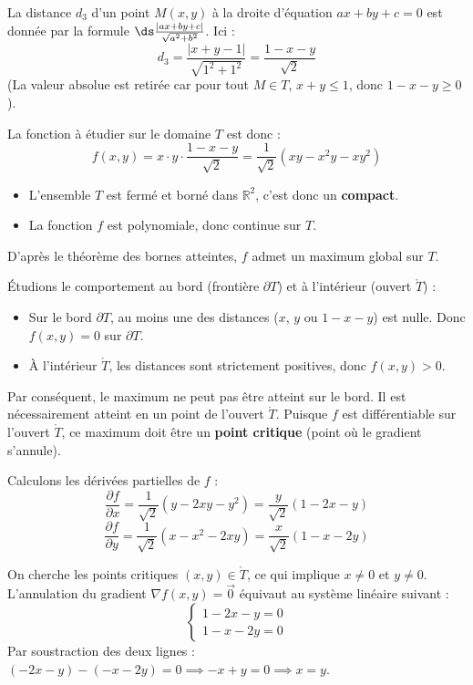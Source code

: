 \begin{exemple}
    La distance $d_3$ d'un point $M(x,y)$ à la droite d'équation $ax+by+c=0$ est donnée par la formule $\ds \frac{|ax+by+c|}{\sqrt{a^2+b^2}}$. Ici :
    \[
    d_3 = \frac{|x+y-1|}{\sqrt{1^2+1^2}} = \frac{1-x-y}{\sqrt{2}}
    \]
    (La valeur absolue est retirée car pour tout $M \in T$, $x+y \le 1$, donc $1-x-y \ge 0$).

    La fonction à étudier sur le domaine $T$ est donc :
    \[
    f(x,y) = x \cdot y \cdot \frac{1-x-y}{\sqrt{2}} = \frac{1}{\sqrt{2}} (xy - x^2y - xy^2)
    \]


    \svspace \begin{itemize}
        \item L'ensemble $T$ est fermé et borné dans $\mathbb{R}^2$, c'est donc un \textbf{compact}.
        \item La fonction $f$ est polynomiale, donc continue sur $T$.
    \end{itemize}
    D'après le théorème des bornes atteintes, $f$ admet un maximum global sur $T$.

    Étudions le comportement au bord (frontière $\partial T$) et à l'intérieur (ouvert $\mathring{T}$) :
    \begin{itemize}
        \item Sur le bord $\partial T$, au moins une des distances ($x$, $y$ ou $1-x-y$) est nulle. Donc $f(x,y) = 0$ sur $\partial T$.
        \item À l'intérieur $\mathring{T}$, les distances sont strictement positives, donc $f(x,y) > 0$.
    \end{itemize}
    Par conséquent, le maximum ne peut pas être atteint sur le bord. Il est nécessairement atteint en un point de l'ouvert $\mathring{T}$.
    Puisque $f$ est différentiable sur l'ouvert $\mathring{T}$, ce maximum doit être un \textbf{point critique} (point où le gradient s'annule).


    \svspace Calculons les dérivées partielles de $f$ :
    \[
    \frac{\partial f}{\partial x} = \frac{1}{\sqrt{2}} (y - 2xy - y^2) = \frac{y}{\sqrt{2}} (1 - 2x - y)
    \]
    \[
    \frac{\partial f}{\partial y} = \frac{1}{\sqrt{2}} (x - x^2 - 2xy) = \frac{x}{\sqrt{2}} (1 - x - 2y)
    \]

    On cherche les points critiques $(x,y) \in \mathring{T}$, ce qui implique $x \neq 0$ et $y \neq 0$. L'annulation du gradient $\nabla f(x,y) = \vec{0}$ équivaut au système linéaire suivant :
    \[
    \begin{cases}
    1 - 2x - y = 0 \\
    1 - x - 2y = 0
    \end{cases}
    \]
    Par soustraction des deux lignes : $(-2x - y) - (-x - 2y) = 0 \implies -x + y = 0 \implies x = y$.


\end{exemple}
